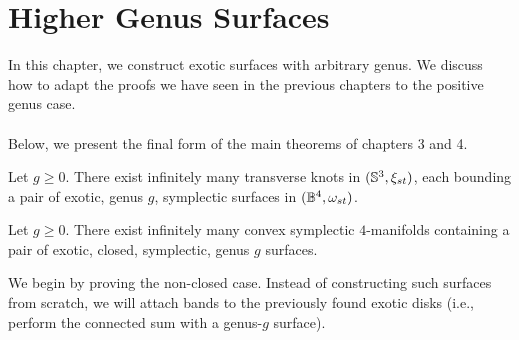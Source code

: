 \chapter{Higher Genus Surfaces}
In this chapter, we construct exotic surfaces with arbitrary genus. We discuss how to adapt the proofs we have seen in the previous chapters to the positive genus case. \\ \\

Below, we present the final form of the main theorems of chapters 3 and 4.
\begin{thm}Let $g \geq 0$. There exist infinitely many transverse knots in $(\mathbb{S}^3, \xi_{st})$, each bounding a pair of exotic, genus $g$, symplectic surfaces in $(\mathbb{B}^4, \omega_{st})$.
\end{thm}
\begin{thm} \label{ulti} Let $g \geq 0$. There exist infinitely many convex symplectic $4$-manifolds containing a pair of exotic, closed, symplectic, genus $g$ surfaces.
\end{thm}




We begin by proving the non-closed case. Instead of constructing such surfaces from scratch, we will attach bands to the previously found exotic disks (i.e., perform the connected sum with a genus-$g$ surface).
